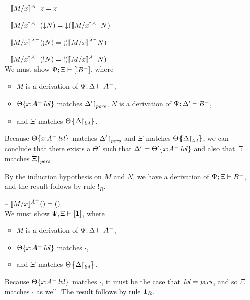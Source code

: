 \begin{itemize}
\item[--] $\rsubsta{M}{x}{z}{A^-} = z$
\item[--] $\rsubsta{M}{x}{(\tdownr{N})}{A^-}
           = \tdownr{(\rsubsta{M}{x}{N}{A^-})}$
\item[--] $\rsubsta{M}{x}{(\tgnabr{N})}{A^-}
           = \tgnabr{(\rsubsta{M}{x}{N}{A^-})}$
\item[--] $\rsubsta{M}{x}{(\tbangr{N})}{A^-}
           = \tbangr{(\rsubsta{M}{x}{N}{A^-})}$\smallskip\\
  We must show $\foc{\Psi}{\Xi}{[{!}B^-]}$, where 
  \begin{itemize}
  \item $M$ is a derivation of $\foc{\Psi}{\Delta}{A^-}$, 
  \item $\tackon{\Theta}{x{:}\islvl{A^-}}$ matches 
     $\restrictto{\Delta'}{\mpers}$,
     $N$ is a derivation of $\foc{\Psi}{\Delta'}{B^-}$, 
  \item and $\Xi$ matches $\frameoff{\Theta}{\restrictto{\Delta}{\mlvl}}$.
  \end{itemize}
  Because $\tackon{\Theta}{x{:}\islvl{A^-}}$ matches
  $\restrictto{\Delta'}{\mpers}$ and $\Xi$ matches 
  $\frameoff{\Theta}{\restrictto{\Delta}{\mlvl}}$, we can conclude that
  there exists a $\Theta'$ such that
  $\Delta' = \tackon{\Theta'}{x{:}\islvl{A^-}}$ and also that
  $\Xi$ matches $\restrictto{\Xi}{\mpers}$.

  By the induction hypothesis on $M$ and $N$, 
  we have a derivation of $\foc{\Psi}{\Xi}{B^-}$, 
  and the result follows by rule ${!}_R$. 

\smallskip

\item[--] $\rsubsta{M}{x}{\toner}{A^-} = \toner$ \smallskip\\
  We must show $\foc{\Psi}{\Xi}{[\one]}$, where
  \begin{itemize}
  \item $M$ is a derivation of $\foc{\Psi}{\Delta}{A^-}$, 
  \item $\tackon{\Theta}{x{:}\islvl{A^-}}$ matches $\cdot$,
  \item and $\Xi$ matches $\frameoff{\Theta}{\restrictto{\Delta}{\mlvl}}$.
  \end{itemize}
  Because $\tackon{\Theta}{x{:}\islvl{A^-}}$ matches $\cdot$, it must
  be the case that $\mlvl = \mpers$, and so 
  $\Xi$ matches $\cdot$ as well. The result follows by rule ${\one}_R$. 

\smallskip


\end{itemize}
